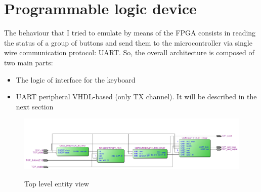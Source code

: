 \section{Programmable logic device}

The behaviour that I tried to emulate by means of the FPGA consists in reading the status of a group of buttons and send them to the microcontroller via single wire communication protocol: UART. So, the overall architecture is composed of two main parts:
\begin{itemize}
\item The logic of interface for the keyboard
\item UART peripheral VHDL-based (only TX channel). It will be described in the next section
\end{itemize}

\begin{figure}[H]
\centering
\includegraphics[scale=.5]{Immagini/15}
\label{15}
\caption{Top level entity view}
\end{figure}

